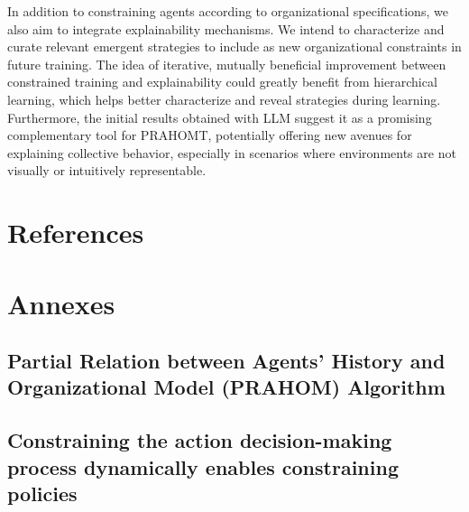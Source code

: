 \documentclass[runningheads]{llncs}
\theoremstyle{freethm}
\theoremstyle{proofoutline}
\newcounter{proof}
\begin{document}
In addition to constraining agents according to organizational specifications, we also aim to integrate explainability mechanisms. We intend to characterize and curate relevant emergent strategies to include as new organizational constraints in future training. The idea of iterative, mutually beneficial improvement between constrained training and explainability could greatly benefit from hierarchical learning, which helps better characterize and reveal strategies during learning. Furthermore, the initial results obtained with LLM suggest it as a promising complementary tool for PRAHOMT, potentially offering new avenues for explaining collective behavior, especially in scenarios where environments are not visually or intuitively representable.


\section*{References}





\newpage

\section*{Annexes}

\subsection*{Partial Relation between Agents' History and Organizational Model (PRAHOM) Algorithm}


\subsection*{Constraining the action decision-making process dynamically enables constraining policies}

\end{document}
